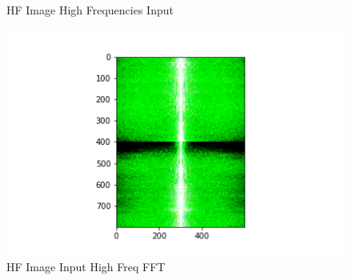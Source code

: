 \documentclass{article}
\begin{document}
\begin{figure}[!htb]
    \caption{HF Image High Frequencies Input}\label{fig:awesome_image2}
\endminipage
{}
    \includegraphics[width=\linewidth]{lion fourier.png}
    \caption{HF Image Input High Freq FFT}\label{fig:awesome_image2}
\endminipage
\end{figure}
\end{document}
